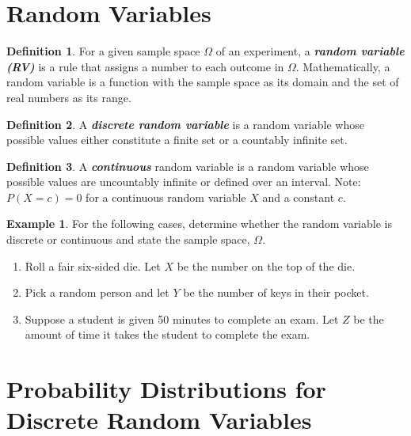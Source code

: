 \documentclass[
  11pt,
  oneside]{book}
\theoremstyle{definition}
\newtheorem{definition}{Definition}[chapter]
\theoremstyle{definition}
\newtheorem{example}{Example}[chapter]
\theoremstyle{definition}
\theoremstyle{definition}
\theoremstyle{remark}
\begin{document}
\section{Random Variables}\label{random-variables}

\begin{definition}
For a given sample space \(\Omega\) of an experiment, a \textbf{\emph{random variable (RV)}} is a rule that assigns a number to each outcome in \(\Omega\). Mathematically, a random variable is a function with the sample space as its domain and the set of real numbers as its range.
\end{definition}

\begin{definition}
A \textbf{\emph{discrete random variable}} is a random variable whose possible values either constitute a finite set or a countably infinite set.
\end{definition}

\begin{definition}
A \textbf{\emph{continuous}} random variable is a random variable whose possible values are uncountably infinite or defined over an interval. Note: \(P(X=c)=0\) for a continuous random variable \(X\) and a constant \(c\).
\end{definition}

\begin{example}
For the following cases, determine whether the random variable is discrete or continuous and state the sample space, \(\Omega\).
\end{example}

\begin{enumerate}
\def\labelenumi{(\alph{enumi})}
\item
  Roll a fair six-sided die. Let \(X\) be the number on the top of the die.
  \vfill
\item
  Pick a random person and let \(Y\) be the number of keys in their pocket.
  \vfill
\item
  Suppose a student is given 50 minutes to complete an exam. Let \(Z\) be the amount of time it takes the student to complete the exam.
  \vfill
\end{enumerate}

\newpage

\section{Probability Distributions for Discrete Random Variables}\label{probability-distributions-for-discrete-random-variables}
\end{document}
